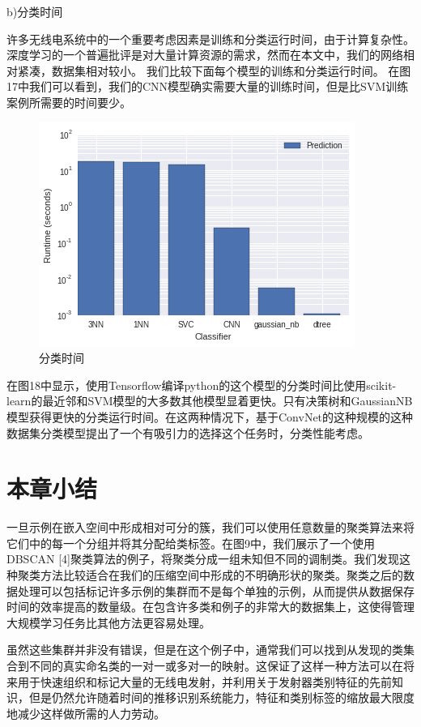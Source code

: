 b)分类时间

许多无线电系统中的一个重要考虑因素是训练和分类运行时间，由于计算复杂性。 深度学习的一个普遍批评是对大量计算资源的需求，然而在本文中，我们的网络相对紧凑，数据集相对较小。 我们比较下面每个模型的训练和分类运行时间。 在图17中我们可以看到，我们的CNN模型确实需要大量的训练时间，但是比SVM训练案例所需要的时间要少。\par
\begin{figure}[!h]
	\centering
	\includegraphics[scale=0.6]{figures/chapter_3/fig_3_13}
	\caption{分类时间}	\label{sec:fig_3_13}
\end{figure}

在图18中显示，使用Tensorflow编译python的这个模型的分类时间比使用scikit-learn的最近邻和SVM模型的大多数其他模型显着更快。只有决策树和GaussianNB模型获得更快的分类运行时间。在这两种情况下，基于ConvNet的这种规模的这种数据集分类模型提出了一个有吸引力的选择这个任务时，分类性能考虑。\par


\section{本章小结}

一旦示例在嵌入空间中形成相对可分的簇，我们可以使用任意数量的聚类算法来将它们中的每一个分组并将其分配给类标签。在图9中，我们展示了一个使用DBSCAN [4]聚类算法的例子，将聚类分成一组未知但不同的调制类。我们发现这种聚类方法比较适合在我们的压缩空间中形成的不明确形状的聚类。聚类之后的数据处理可以包括标记许多示例的集群而不是每个单独的示例，从而提供从数据保存时间的效率提高的数量级。在包含许多类和例子的非常大的数据集上，这使得管理大规模学习任务比其他方法更容易处理。\par
虽然这些集群并非没有错误，但是在这个例子中，通常我们可以找到从发现的类集合到不同的真实命名类的一对一或多对一的映射。这保证了这样一种方法可以在将来用于快速组织和标记大量的无线电发射，并利用关于发射器类别特征的先前知识，但是仍然允许随着时间的推移识别系统能力，特征和类别标签的缩放最大限度地减少这样做所需的人力劳动。\par

